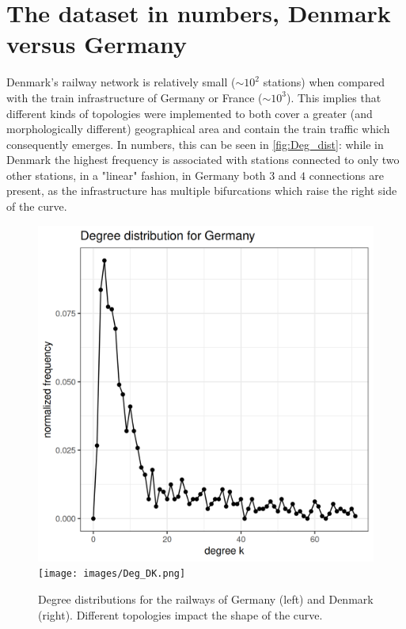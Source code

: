 \section{The dataset in numbers, Denmark versus Germany}
Denmark's railway network is relatively small ($\sim 10^2$ stations) when compared with the train infrastructure of Germany or France ($\sim 10^3$). This implies that different kinds of topologies were implemented to both cover a greater (and morphologically different) geographical area and contain the train traffic which consequently emerges. In numbers, this can be seen in \autoref{fig:Deg_dist}: while in Denmark the highest frequency is associated with stations connected to only two other stations, in a "linear" fashion, in Germany both $3$ and $4$ connections are present, as the infrastructure has multiple bifurcations which raise the right side of the curve.

\begin{figure}
    \includegraphics[width=0.45\linewidth]{images/Deg_DE.png}
    \texttt{[image: images/Deg\_DK.png]}
    \label{fig:Deg_dist}
    \caption[short]{Degree distributions for the railways of Germany (left) and Denmark (right). Different topologies impact the shape of the curve.}
\end{figure}
